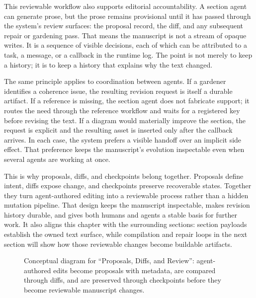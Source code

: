 \documentclass[11pt]{article}
\begin{document}
This reviewable workflow also supports editorial accountability. A section agent can generate prose, but the prose remains provisional until it has passed through the system's review surfaces: the proposal record, the diff, and any subsequent repair or gardening pass. That means the manuscript is not a stream of opaque writes. It is a sequence of visible decisions, each of which can be attributed to a task, a message, or a callback in the runtime log. The point is not merely to keep a history; it is to keep a history that explains why the text changed.

The same principle applies to coordination between agents. If a gardener identifies a coherence issue, the resulting revision request is itself a durable artifact. If a reference is missing, the section agent does not fabricate support; it routes the need through the reference workflow and waits for a registered key before revising the text. If a diagram would materially improve the section, the request is explicit and the resulting asset is inserted only after the callback arrives. In each case, the system prefers a visible handoff over an implicit side effect. That preference keeps the manuscript's evolution inspectable even when several agents are working at once.

This is why proposals, diffs, and checkpoints belong together. Proposals define intent, diffs expose change, and checkpoints preserve recoverable states. Together they turn agent-authored editing into a reviewable process rather than a hidden mutation pipeline. That design keeps the manuscript inspectable, makes revision history durable, and gives both humans and agents a stable basis for further work. It also aligns this chapter with the surrounding sections: section payloads establish the owned text surface, while compilation and repair loops in the next section will show how those reviewable changes become buildable artifacts.

\begin{figure}[htbp]
\centering

\caption{Conceptual diagram for ``Proposals, Diffs, and Review'': agent-authored edits become proposals with metadata, are compared through diffs, and are preserved through checkpoints before they become reviewable manuscript changes.}
\end{figure}
\end{document}
